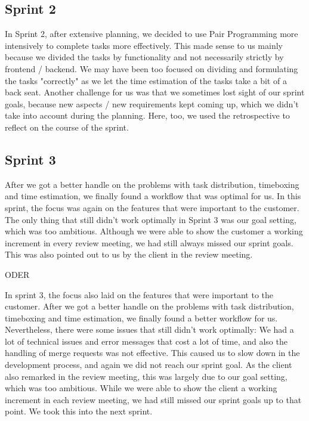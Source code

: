 \subsection{Sprint 2}
In Sprint 2, after extensive planning, we decided to use Pair Programming more intensively to complete tasks more effectively.
This made sense to us mainly because we divided the tasks by functionality and not necessarily strictly by frontend / backend.
We may have been too focused on dividing and formulating the tasks "correctly" as we let the time estimation of the tasks take a bit of a back seat.
Another challenge for us was that we sometimes lost sight of our sprint goals, because new aspects / new requirements kept coming up, which we didn't take into account during the planning.
Here, too, we used the retrospective to reflect on the course of the sprint.

\subsection{Sprint 3}
After we got a better handle on the problems with task distribution, timeboxing and time estimation, we finally found a workflow that was optimal for us.
In this sprint, the focus was again on the features that were important to the customer.
The only thing that still didn't work optimally in Sprint 3 was our goal setting, which was too ambitious.
Although we were able to show the customer a working increment in every review meeting, we had still always missed our sprint goals.
This was also pointed out to us by the client in the review meeting.

ODER

In sprint 3, the focus also laid on the features that were important to the customer.
After we got a better handle on the problems with task distribution, timeboxing and time estimation, we finally found a better workflow for us.
Nevertheless, there were some issues that still didn't work optimally: We had a lot of technical issues and error messages that cost a lot of time, and also the handling of merge requests was not effective.
This caused us to slow down in the development process, and again we did not reach our sprint goal.
As the client also remarked in the review meeting, this was largely due to our goal setting, which was too ambitious.
While we were able to show the client a working increment in each review meeting, we had still missed our sprint goals up to that point.
We took this into the next sprint.


